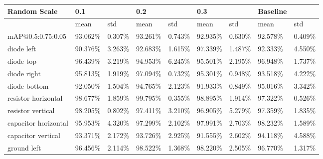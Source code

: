 
\begin{table}[H]
\scriptsize %
\begin{center}
\begin{tabular}{|l|l|l|l|l|l|l|l|l|}
\hline
Random Scale                    & 0.1      &          & \cellcolor{green}0.2      &          & 0.3      &          & Baseline &              \\
\hline
                                & mean     & std      & mean     & std      & mean     & std      & mean     & std          \\
\hline
mAP@0.5:0.75:0.05               & 93.062\% & 0.307\% & \cellcolor{green}93.261\% & 0.743\% & 92.935\%   & 0.630\%   & 92.578\%  & 0.409\%   \\
\hline
\rowcolor{lightgray!50}
diode left                      & 90.376\% & 3.263\% & 92.683\% & 1.615\% & 97.339\%   & 1.487\%   & 92.333\%  & 4.550\%   \\
diode top                       & 96.439\% & 3.219\% & 94.953\% & 6.245\% & 95.501\%   & 2.195\%   & 96.948\%  & 1.737\%   \\
\rowcolor{lightgray!50}
diode right                     & 95.813\% & 1.919\% & 97.094\% & 0.732\% & 95.301\%   & 0.948\%   & 93.518\%  & 4.222\%   \\
diode bottom                    & 92.050\% & 1.504\% & 94.765\% & 2.123\% & 91.933\%   & 0.849\%   & 95.016\%  & 3.342\%   \\
\rowcolor{lightgray!50}
resistor horizontal             & 98.677\% & 1.859\% & 99.795\% & 0.355\% & 98.895\%   & 1.914\%   & 97.322\%  & 0.526\%   \\
resistor vertical               & 98.205\% & 0.802\% & 97.411\% & 3.210\% & 96.905\%   & 5.279\%   & 97.359\%  & 1.835\%   \\
\rowcolor{lightgray!50}
capacitor horizontal            & 95.953\% & 4.320\% & 97.299\% & 2.102\% & 97.991\%   & 2.703\%   & 98.232\%  & 1.589\%   \\
capacitor vertical              & 93.371\% & 2.172\% & 93.726\% & 2.925\% & 91.555\%   & 2.602\%   & 94.118\%  & 4.588\%   \\
\rowcolor{lightgray!50}
ground left                     & 96.456\% & 2.114\% & 98.522\% & 1.368\% & 98.220\%   & 2.505\%   & 96.770\%  & 1.317\%   \\

\end{tabular}
\end{center}
\end{table}
